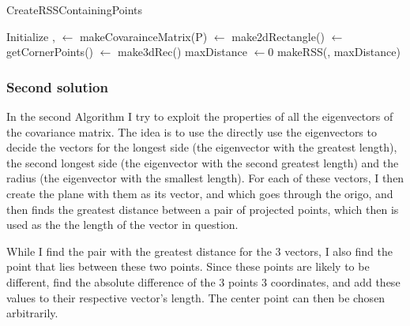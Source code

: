 \begin{algorithm}[H]
  \caption{CreateRSSContainingPoints}
   
   
  \dontprintsemicolon
  Initialize \twodeeP, \cornThree \;
  \covar $\gets$ makeCovarainceMatrix(P)\;
  \twodeeRec $\gets$ make2dRectangle(\twodeeP) \;
  \cornTwo $\gets$ getCornerPoints(\twodeeRec) \;
  \threedeeRec $\gets$ make3dRec(\cornThree) \;
  maxDistance $\gets 0$ \;
  \return makeRSS(\threedeeRec, maxDistance)
\end{algorithm}

\subsubsection{Second solution}

In the second Algorithm I try to exploit the properties of all the eigenvectors of the covariance matrix. The idea is to use the directly use the eigenvectors to decide the vectors for the longest side (the eigenvector with the greatest length), the second longest side (the eigenvector with the second greatest length) and the radius (the eigenvector with the smallest length). For each of these vectors, I then create the plane with them as its vector, and which goes through the origo, and then finds the greatest distance between a pair of projected points, which then is used as the the length of the vector in question.

While I find the pair with the greatest distance for the 3 vectors, I also find the point that lies between these two points. Since these points are likely to be different, find the absolute difference of the 3 points 3 coordinates, and add these values to their respective vector's length. The center point can then be chosen arbitrarily.

